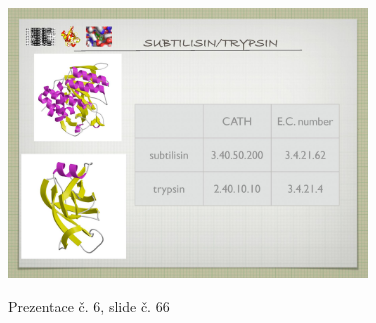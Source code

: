 \documentclass[DIV=8]{scrreprt}
\begin{document}
\begin{figure}
    \caption{Prezentace č. 6, slide č. 66}
    \includegraphics[width=0.85\textwidth]{slides-6/slide-66.jpg}
    \centering
    \label{slides-6-slide-66}
\end{figure}
\end{document}

